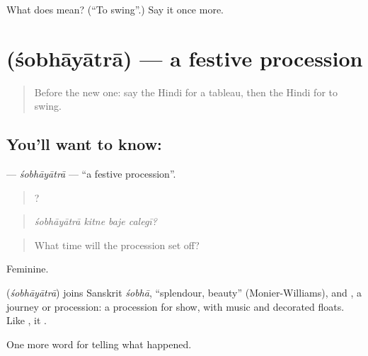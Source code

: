 \begin{tcolorbox}[breakable,colback=teal!4,colframe=teal!35!black,title={Before you move on}]
What does  mean? (\textquotedblleft{}To swing\textquotedblright{}.) Say it once more.
\end{tcolorbox}
\section[\texorpdfstring{\hi{शोभायात्रा} (śobhāyātrā)}{शोभायात्रा (śobhāyātrā)}]{ (śobhāyātrā) — a festive procession}

\label{lesson:HI-C330-sobhayatra}



\begin{quote}
Before the new one: say the Hindi for a tableau, then the Hindi for to swing.
\end{quote}

\subsection*{You'll want to know: }
\textbf{} — \emph{śobhāyātrā} — \textquotedblleft{}a festive procession\textquotedblright{}.

\begin{quote}
   ?
\end{quote}

\begin{quote}
\emph{śobhāyātrā kitne baje calegī?}
\end{quote}

\begin{quote}
What time will the procession set off?
\end{quote}

Feminine.

\begin{cousinweb}
\textbf{} (\emph{śobhāyātrā}) joins Sanskrit \emph{śobhā}, \textquotedblleft{}splendour, beauty\textquotedblright{} (Monier-Williams), and \textbf{}, a journey or procession: a procession for show, with music and decorated floats. Like \textbf{}, it \textbf{ }.
\end{cousinweb}

\begin{grammarlens}[title={What you've built}]
One more word for telling what happened.
\end{grammarlens}


